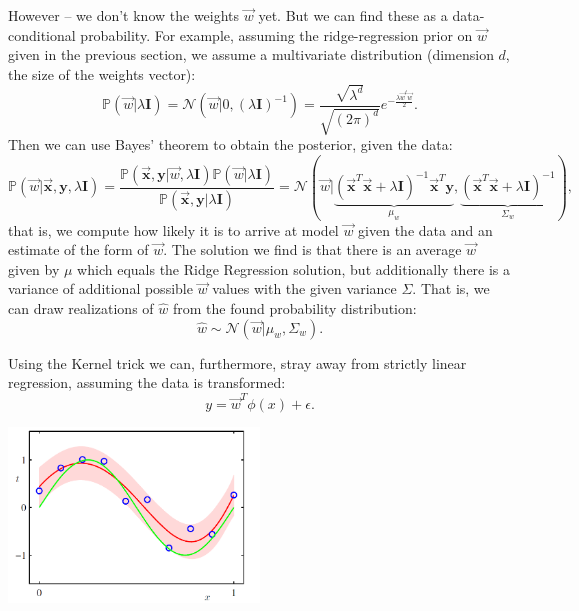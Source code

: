 \documentclass{article}
\begin{document}
However -- we don't know the weights $\vec{w}$ yet. But we can find these as a data-conditional probability. For example, assuming the ridge-regression prior on $\vec{w}$ given in the previous section, we assume a multivariate distribution (dimension $d$, the size of the weights vector):
\begin{equation}
    \mathbb{P}(\vec{w}|\lambda\mathbf{I}) = \mathcal{N}(\vec{w}|0,(\lambda\mathbf{I})^{-1}) = \frac{\sqrt{\lambda^d}}{\sqrt{(2\pi)^d}}e^{-\frac{\lambda \vec{w}^t\vec{w}}{2}}.
\end{equation}
Then we can use Bayes' theorem to obtain the posterior, given the data:
\begin{equation}
    \mathbb{P}(\vec{w}|\mathbf{\vec{x}},\mathbf{y},\lambda\mathbf{I}) = \frac{\mathbb{P}(\mathbf{\vec{x}},\mathbf{y}|\vec{w},\lambda\mathbf{I})\mathbb{P}(\vec{w}|\lambda\mathbf{I})}{\mathbb{P}(\mathbf{\vec{x}},\mathbf{y}|\lambda\mathbf{I})} = \mathcal{N}(\vec{w}|\underbrace{(\mathbf{\vec{x}}^T\mathbf{\vec{x}}+\lambda\mathbf{I})^{-1}\mathbf{\vec{x}}^T\mathbf{y}}_{\mu_w},\underbrace{(\mathbf{\vec{x}}^T\mathbf{\vec{x}}+\lambda\mathbf{I})^{-1}}_{\Sigma_w}),
\end{equation}
that is, we compute how likely it is to arrive at model $\vec{w}$ given the data and an estimate of the form of $\vec{w}$. The solution we find is that there is an average $\vec{w}$ given by $\mu$ which equals the Ridge Regression solution, but additionally there is a variance of additional possible $\vec{w}$ values with the given variance $\Sigma$. That is, we can draw realizations of $\widehat{w}$ from the found probability distribution:
\begin{equation}
    \widehat{w} \sim \mathcal{N}(\vec{w}|\mu_w,\Sigma_w).
\end{equation}

Using the Kernel trick we can, furthermore, stray away from strictly linear regression, assuming the data is transformed:
\begin{equation}
    y = \vec{w}^T\phi(x)+\epsilon.
\end{equation}
\begin{center}\includegraphics[width=0.5\textwidth]{bishop.png}\end{center}
\end{document}
